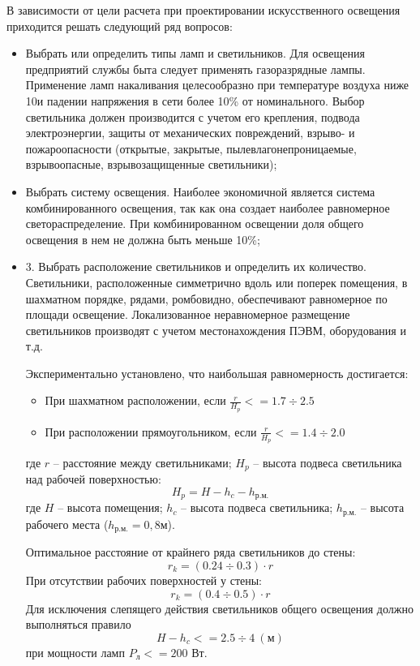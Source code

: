В зависимости от цели расчета при проектировании искусственного освещения приходится решать следующий ряд вопросов:
\begin{itemize}
    \item Выбрать или определить типы ламп и светильников. Для освещения предприятий службы быта следует применять
        газоразрядные лампы. Применение ламп накаливания целесообразно при температуре воздуха ниже 10\celsius и падении напряжения в
            сети более 10\% от номинального.
            Выбор светильника должен производится с учетом его крепления, подвода электроэнергии, защиты от механических
            повреждений, взрыво- и пожароопасности (открытые, закрытые, пылевлагонепроницаемые, взрывоопасные, взрывозащищенные
                    светильники);

    \item Выбрать систему освещения. Наиболее экономичной является система комбинированного освещения, так как она создает
    наиболее равномерное светораспределение.
    При комбинированном освещении доля общего освещения в нем не должна быть меньше 10\%;

    \item 3. Выбрать расположение светильников и определить их количество. Светильники, расположенные симметрично вдоль или
    поперек помещения, в шахматном порядке, рядами, ромбовидно, обеспечивают равномерное по площади освещение. Локализованное
    неравномерное размещение светильников производят с учетом местонахождения ПЭВМ, оборудования и т.д.

    Экспериментально установлено, что наибольшая равномерность достигается:
    \begin{itemize}
        \item При шахматном расположении, если
            $ \frac{r}{H_p} <= 1.7\div 2.5 $
        \item При расположении прямоугольником, если
            $ \frac{r}{H_p} <= 1.4\div 2.0 $
    \end{itemize}
    где $ r $ -- расстояние между светильниками; $ H_p $ -- высота подвеса светильника над рабочей поверхностью:
    \begin{equation}\label{eq:light_height}
        H_p = H - h_c - h_{р.м.}
    \end{equation}
    где $ H $ -- высота помещения; $ h_c $ --  высота подвеса светильника; $ h_{р.м.} $ --
    высота рабочего места ($h_{р.м.} = 0,8 м$).

    Оптимальное расстояние от крайнего ряда светильников до стены:
        $$ r_k = (0.24 \div 0.3) \cdot r $$
    При отсутствии рабочих поверхностей у стены: $$ r_k = (0.4 \div 0.5) \cdot r $$
    Для исключения слепящего действия светильников общего освещения должно выполняться правило
    $$ H - h_c <= 2.5 \div 4\ (м) $$ при мощности ламп $ P_л <= 200 $ Вт.


\end{itemize}
